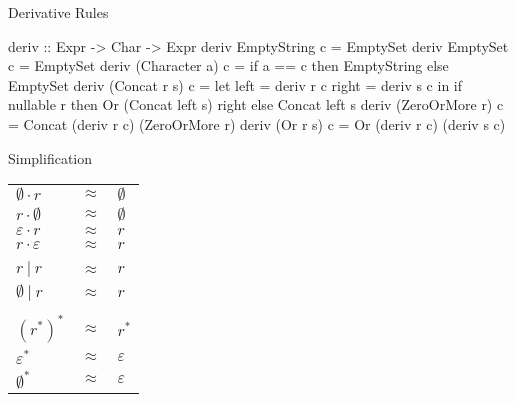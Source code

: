 \documentclass[10pt]{beamer}
\begin{document}
\begin{frame}[fragile]{Derivative Rules}


\begin{center}
\begin{haskellcode}
deriv :: Expr -> Char -> Expr
deriv EmptyString c = EmptySet
deriv EmptySet c = EmptySet
deriv (Character a) c = if a == c 
  then EmptyString else EmptySet
deriv (Concat r s) c =
  let left = deriv r c
      right = deriv s c
  in if nullable r
     then Or (Concat left s) right
     else Concat left s
deriv (ZeroOrMore r) c =
  Concat (deriv r c) (ZeroOrMore r)
deriv (Or r s) c =
  Or (deriv r c) (deriv s c)
\end{haskellcode}
\end{center}
\end{frame}

\begin{frame}[fragile]{Simplification}


\begin{center}
\begin{tabular}{lll}
$\emptyset \cdot r$ & $\approx$ & $\emptyset$ \\
$r \cdot \emptyset$ & $\approx$ & $\emptyset$ \\
$\varepsilon \cdot r$ & $\approx$ & $r$ \\
$r \cdot \varepsilon$ & $\approx$ & $r$ \\
\\
$r\ |\ r$ & $\approx$ & $r$ \\
$\emptyset\ |\ r$ & $\approx$ & $r$ \\
\\
$(r^{*})^{*}$ & $\approx$ & $r^{*}$ \\
$\varepsilon^{*}$ & $\approx$ & $\varepsilon$ \\
$\emptyset^{*}$ & $\approx$ & $\varepsilon$ \\
\end{tabular}
\end{center}
\end{frame}
\end{document}
